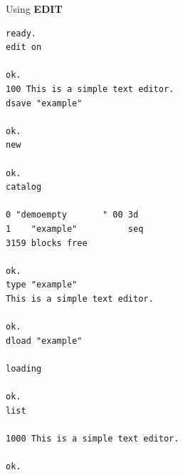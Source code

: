 \begin{description}[leftmargin=2cm,style=nextline]
\newpage

\item [Example:] Using {\bf EDIT}
\begin{tcolorbox}[colback=black,coltext=white]
\verbatimfont{\codefont}
\begin{verbatim}
ready.
edit on

ok.
100 This is a simple text editor.
dsave "example"

ok.
new

ok.
catalog

0 "demoempty       " 00 3d
1    "example"          seq
3159 blocks free

ok.
type "example"
This is a simple text editor.

ok.
dload "example"

loading

ok.
list

1000 This is a simple text editor.

ok.
\end{verbatim}
\end{tcolorbox}
\end{description}


\newpage
